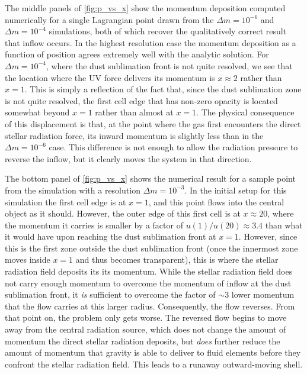 \documentclass[useAMS,usenatbib]{mn2e}
\begin{document}
The middle panels of \autoref{fig:p_vs_x} show the momentum deposition computed numerically for a single Lagrangian point drawn from the $\Delta m = 10^{-6}$ and $\Delta m = 10^{-4}$ simulations, both of which recover the qualitatively correct result that inflow occurs. In the highest resolution case the momentum deposition as a function of position agrees extremely well with the analytic solution. For $\Delta m = 10^{-4}$, where the dust sublimation front is not quite resolved, we see that the location where the UV force delivers its momentum is $x\approx 2$ rather than $x = 1$. This is simply a reflection of the fact that, since the dust sublimation zone is not quite resolved, the first cell edge that has non-zero opacity is located somewhat beyond $x=1$ rather than almost at $x=1$. The physical consequence of this displacement is that, at the point where the gas first encounters the direct stellar radiation force, its inward momentum is slightly less than in the $\Delta m = 10^{-6}$ case. This difference is not enough to allow the radiation pressure to reverse the inflow, but it clearly moves the system in that direction.

The bottom panel of \autoref{fig:p_vs_x} shows the numerical result for a sample point from the simulation with a resolution $\Delta m = 10^{-3}$. In the initial setup for this simulation the first cell edge is at $x=1$, and this point flows into the central object as it should. However, the outer edge of this first cell is at $x\approx 20$, where the momentum it carries is smaller by a factor of $u(1)/u(20) \approx 3.4$ than what it would have upon reaching the dust sublimation front at $x=1$. However, since this is the first zone outside the dust sublimation front (once the innermost zone moves inside $x=1$ and thus becomes transparent), this is where the stellar radiation field deposits its its momentum. While the stellar radiation field does not carry enough momentum to overcome the momentum of inflow at the dust sublimation front, it \textit{is} sufficient to overcome the factor of $\sim 3$ lower momentum that the flow carries at this larger radius. Consequently, the flow reverses. From that point on, the problem only gets worse. The reversed flow begins to move away from the central radiation source, which does not change the amount of momentum the direct stellar radiation deposits, but \textit{does} further reduce the amount of momentum that gravity is able to deliver to fluid elements before they confront the stellar radiation field. This leads to a runaway outward-moving shell.
\end{document}
